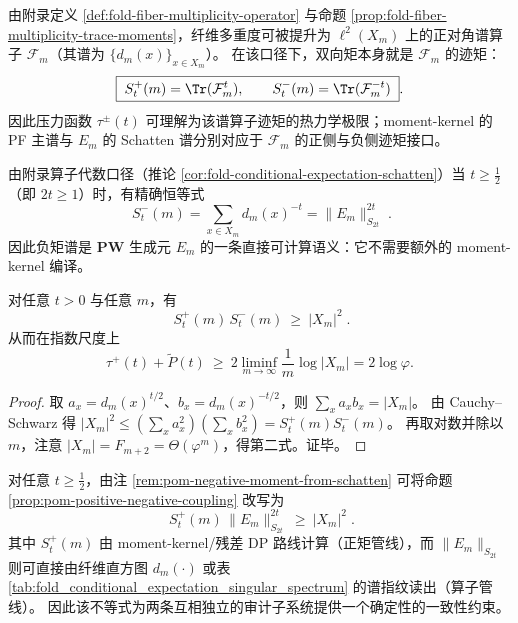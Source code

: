 \begin{remark}[空间损失的谱算子实现：\texorpdfstring{$\mathcal{F}_m=(E_mE_m^\ast)^{-1}$}{Fm=(EmEm*)^{-1}}]\label{rem:pom-fiber-loss-as-spectral-operator}
由附录定义 \ref{def:fold-fiber-multiplicity-operator} 与命题 \ref{prop:fold-fiber-multiplicity-trace-moments}，纤维多重度可被提升为 \(\ell^2(X_m)\) 上的正对角谱算子 \(\mathcal{F}_m\)（其谱为 \(\{d_m(x)\}_{x\in X_m}\)）。
在该口径下，双向矩本身就是 \(\mathcal{F}_m\) 的迹矩：
$$
\boxed{\;
S^{+}_{t}(m)=\Tr(\mathcal{F}_m^{t}),\qquad
S^{-}_{t}(m)=\Tr(\mathcal{F}_m^{-t})\; }.
$$
因此压力函数 \(\tau^{\pm}(t)\) 可理解为该谱算子迹矩的热力学极限；moment-kernel 的 PF 主谱与 \(E_m\) 的 Schatten 谱分别对应于 \(\mathcal{F}_m\) 的正侧与负侧迹矩接口。
\end{remark}



\begin{remark}\label{rem:pom-negative-moment-from-schatten}
由附录算子代数口径（推论 \ref{cor:fold-conditional-expectation-schatten}）当 \(t\ge \frac12\)（即 \(2t\ge 1\)）时，有精确恒等式
$$
\boxed{\;
S^{-}_{t}(m)=\sum_{x\in X_m}d_m(x)^{-t}=\|E_m\|_{S_{2t}}^{2t}\;}.
$$
因此负矩谱是 \(\mathbf{PW}\) 生成元 \(E_m\) 的一条直接可计算语义：它不需要额外的 moment-kernel 编译。
\end{remark}

\begin{proposition}\label{prop:pom-positive-negative-coupling}
对任意 \(t>0\) 与任意 \(m\)，有
$$
\boxed{\;
S^{+}_{t}(m)\,S^{-}_{t}(m)\ \ge\ |X_m|^2\; }.
$$
从而在指数尺度上
$$
\tau^{+}(t)+\widetilde P(t)\ \ge\ 2\liminf_{m\to\infty}\frac{1}{m}\log|X_m|
=2\log\varphi.
$$
\end{proposition}
\begin{proof}
取 \(a_x=d_m(x)^{t/2}\)、\(b_x=d_m(x)^{-t/2}\)，则 \(\sum_x a_xb_x=|X_m|\)。
由 Cauchy--Schwarz 得
\(
|X_m|^2\le (\sum_x a_x^2)(\sum_x b_x^2)=S_t^+(m)S_t^-(m)
\)。
再取对数并除以 \(m\)，注意 \(|X_m|=F_{m+2}=\Theta(\varphi^m)\)，得第二式。证毕。
\end{proof}

\begin{remark}[双管线交叉审计不等式]\label{rem:pom-positive-negative-cross-audit}
对任意 \(t\ge \frac12\)，由注 \ref{rem:pom-negative-moment-from-schatten} 可将命题 \ref{prop:pom-positive-negative-coupling} 改写为
$$
\boxed{\;
S^{+}_{t}(m)\,\|E_m\|_{S_{2t}}^{2t}\ \ge\ |X_m|^2\; }.
$$
其中 \(S_t^{+}(m)\) 由 moment-kernel/残差 DP 路线计算（正矩管线），而 \(\|E_m\|_{S_{2t}}\) 则可直接由纤维直方图 \(d_m(\cdot)\) 或表 \ref{tab:fold_conditional_expectation_singular_spectrum} 的谱指纹读出（算子管线）。
因此该不等式为两条互相独立的审计子系统提供一个确定性的一致性约束。
\end{remark}

